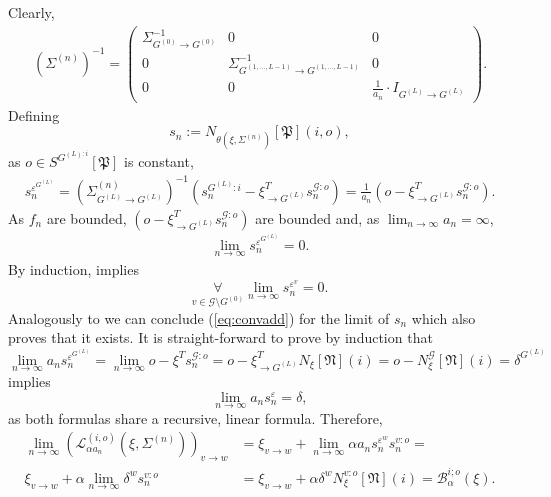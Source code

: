 \documentclass[a4paper,11pt]{report}
\begin{document}
\begin{Bew}
Clearly,
\begin{align*}
\left(\Sigma^{(n)}\right)^{-1}=
\begin{pmatrix}
\Sigma_{G^{(0)}\to G^{(0)}}^{-1} & 0 & 0 \\
0 & \Sigma_{G^{(1,\dotsc, L-1)}\to G^{(1,\dotsc, L-1)}}^{-1} & 0 \\
0 & 0 & \frac{1}{a_n}\cdot I_{G^{(L)}\to G^{(L)}}
\end{pmatrix}.
\end{align*}
Defining
\[
s_n:=N_{\theta(\xi,\Sigma^{(n)})}[\mathfrak{P}](i,o),
\]
as $o\in S^{G^{(L):i}}[\mathfrak{P}]$ is constant, 
\begin{align*}
s_n^{\varepsilon^{G^{(L)}}}=\left(\Sigma_{G^{(L)}\to G^{(L)}}^{(n)}\right)^{-1}(s_n^{G^{(L)}:i}-\xi_{\to G^{(L)}}^T s_n^{\mathcal{G}:o})=\frac{1}{a_n}(o-\xi_{\to G^{(L)}}^Ts_n^{\mathcal{G}:o}).
\end{align*}
As $f_n$ are bounded, $(o-\xi_{\to G^{(L)}}^Ts_n^{\mathcal{G}:o})$ are bounded and, as $\lim_{n\to\infty}a_n=\infty$, 
\begin{align*}
\lim_{n\to\infty}s_n^{\varepsilon^{G^{(L)}}}=0.
\end{align*}
By induction,  implies
\[
\underset{v\in\mathcal{G}\setminus G^{(0)}}{\forall}\lim_{n\to\infty}s_n^{\varepsilon^v}=0.
\]
Analogously to  we can conclude (\ref{eq:convadd}) for the limit of $s_n$ which also proves that it exists. It is straight-forward to prove by induction that
\[
\lim_{n\to\infty}a_ns_n^{\varepsilon^{G^{(L)}}}=\lim_{n\to\infty}o-\xi^Ts_n^{\mathcal{G}:o}=o-\xi_{\to G^{(L)}}^TN_{\xi}[\mathfrak{N}](i)=o-N_{\xi}^{\mathcal{G}}[\mathfrak{N}](i)=\delta^{G^{(L)}}
\]
implies
\[
\lim_{n\to\infty}a_ns_n^{\varepsilon}=\delta,
\]
as both formulas share a recursive, linear formula. Therefore,
\begin{align*}
\lim_{n\to\infty}\left(\mathcal{L}_{\alpha a_n}^{(i,o)}(\xi,\Sigma^{(n)})\right)_{v\to w}&=\xi_{v\to w}+\lim_{n\to\infty}\alpha a_ns_n^{\varepsilon^w}s_n^{v:o}=\\
\xi_{v\to w}+\alpha\lim_{n\to\infty}\delta^ws_n^{v:o}&=\xi_{v\to w}+\alpha \delta^w N^{v:o}_{\xi}[\mathfrak{N}](i)=\mathcal{B}_{\alpha}^{i;o}(\xi).
\end{align*}
\end{Bew}
\end{document}
